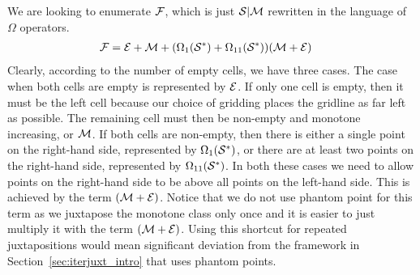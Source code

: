 \documentclass[12pt, a4paper, twoside]{report}
\begin{document}
We are looking to enumerate $\mathcal{F}$, which is just $\mathcal{S}|\mathcal{M}$ rewritten in the language of $\Omega$ operators.
\begin{align}
  \mathcal{F} &=   \mathcal{E} + \mathcal{M} + (\Omega_1(\mathcal{S}^*) + \Omega_{11}(\mathcal{S}^*))(\mathcal{M}+\mathcal{E})
\end{align}
Clearly, according to the number of empty cells, we have three cases. The case when both cells are empty is represented by $\mathcal{E}$. If only one cell is empty, then it must be the left cell because our choice of gridding places the gridline as far left as possible. The remaining cell must then be non-empty and monotone increasing, or $\mathcal{M}$. If both cells are non-empty, then there is either a single point on the right-hand side, represented by $\Omega_1(\mathcal{S}^*)$, or there are at least two points on the right-hand side, represented by $\Omega_{11}(\mathcal{S}^*)$. In both these cases we need to allow points on the right-hand side to be above all points on the left-hand side. This is achieved by the term $(\mathcal{M} + \mathcal{E})$. Notice that we do not use phantom point for this term as we juxtapose the monotone class only once and it is easier to just multiply it with the term $(\mathcal{M}+\mathcal{E})$. Using this shortcut for repeated juxtapositions would mean significant deviation from the framework in Section~\ref{sec:iterjuxt_intro} that uses phantom points.
\end{document}
